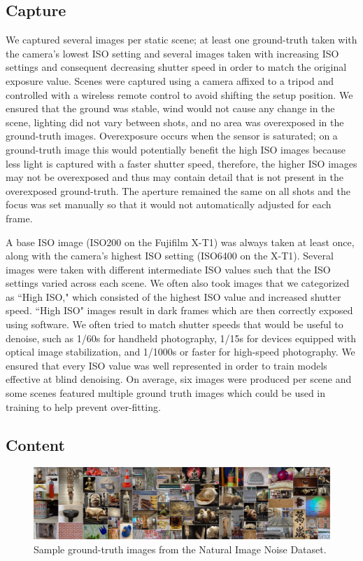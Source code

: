 \documentclass[10pt,twocolumn,letterpaper]{article}
\begin{document}
\subsection{Capture}
We captured several images per static scene; at least one ground-truth taken with the camera's lowest ISO setting and several images taken with increasing ISO settings and consequent decreasing shutter speed in order to match the original exposure value. Scenes were captured using a camera affixed to a tripod and controlled with a wireless remote control to avoid shifting the setup position. We ensured that the ground was stable, wind would not cause any change in the scene, lighting did not vary between shots, and no area was overexposed in the ground-truth images. Overexposure occurs when the sensor is saturated; on a ground-truth image this would potentially benefit the high ISO images because less light is captured with a faster shutter speed, therefore, the higher ISO images may not be overexposed and thus may contain detail that is not present in the overexposed ground-truth. The aperture remained the same on all shots and the focus was set manually so that it would not automatically adjusted for each frame.

A base ISO image (ISO200 on the Fujifilm X-T1) was always taken at least once, along with the camera's highest ISO setting (ISO6400 on the X-T1). Several images were taken with different intermediate ISO values such that the ISO settings varied across each scene. We often also took images that we categorized as ``High ISO," which consisted of the highest ISO value and increased shutter speed. ``High ISO" images result in dark frames which are then correctly exposed using software. We often tried to match shutter speeds that would be useful to denoise, such as 1/60s for handheld photography, 1/15s for devices equipped with optical image stabilization, and 1/1000s or faster for high-speed photography. We ensured that every ISO value was well represented in order to train models effective at blind denoising. On average, six images were produced per scene and some scenes featured multiple ground truth images which could be used in training to help prevent over-fitting.
\subsection{Content}
\begin{figure}
\centering
  \includegraphics[width=1\linewidth]{samplebanner.jpg}
   \caption{Sample ground-truth images from the Natural Image Noise Dataset.}
\vspace{-0.2cm} 
\label{fig:sampleimg}
\end{figure}
\end{document}

